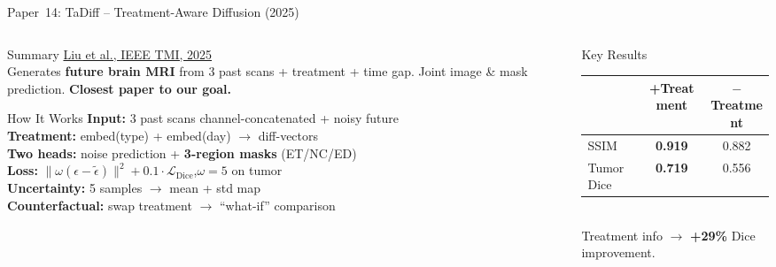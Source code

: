 \documentclass[aspectratio=169,xcolor=dvipsnames]{beamer}
\begin{document}
\begin{frame}{Paper~14: TaDiff -- Treatment-Aware Diffusion (2025)}
    \begin{columns}
        \begin{column}{0.52\textwidth}
            \begin{block}{Summary}
                \scriptsize
                \href{https://arxiv.org/abs/2309.05406}{Liu et al., IEEE TMI, 2025}\\[0.2em]
                Generates \textbf{future brain MRI} from 3 past scans + treatment + time gap. Joint image \& mask prediction. \textbf{Closest paper to our goal.}
            \end{block}

            \vspace{0.1em}

            \begin{block}{How It Works}
                \scriptsize
                \textbf{Input:} 3 past scans channel-concatenated + noisy future\\
                \textbf{Treatment:} embed(type) + embed(day) $\to$ diff-vectors\\
                \textbf{Two heads:} noise prediction + \textbf{3-region masks} (ET/NC/ED)\\
                \textbf{Loss:} $\|\omega(\epsilon{-}\tilde\epsilon)\|^2 + 0.1\cdot\mathcal{L}_{\text{Dice}}$,\enspace $\omega{=}5$ on tumor\\
                \textbf{Uncertainty:} 5 samples $\to$ mean + std map\\
                \textbf{Counterfactual:} swap treatment $\to$ ``what-if'' comparison
            \end{block}
        \end{column}

        \begin{column}{0.44\textwidth}
            \begin{block}{\small Key Results}
                \scriptsize
                \begin{tabular}{lcc}
                    \toprule
                    & \textbf{+Treatment} & \textbf{$-$Treatment} \\
                    \midrule
                    SSIM & \textbf{0.919} & 0.882 \\
                    Tumor Dice & \textbf{0.719} & 0.556 \\
                    \bottomrule
                \end{tabular}\\[0.1em]
                Treatment info $\to$ \textbf{+29\%} Dice improvement.
            \end{block}


\end{column}
\end{columns}
\end{frame}
\end{document}
